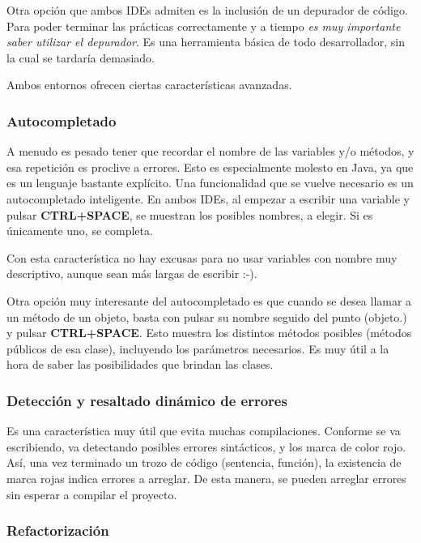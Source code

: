 \documentclass[11pt]{article}
\begin{document}
Otra opción que ambos IDEs admiten es la inclusión de un depurador de código. Para poder terminar las prácticas correctamente y a tiempo \emph{es muy importante saber utilizar el depurador}. Es una herramienta básica de todo desarrollador, sin la cual se tardaría demasiado.

Ambos entornos ofrecen ciertas características avanzadas.

\subsubsection{Autocompletado}
\label{sec-3-2-1}

A menudo es pesado tener que recordar el nombre de las variables y/o métodos, y esa repetición es proclive a errores.  Esto es especialmente molesto en Java, ya que es un lenguaje bastante explícito.  Una funcionalidad que se vuelve necesario es un autocompletado inteligente. En ambos IDEs, al empezar a escribir una variable y pulsar \textbf{CTRL+SPACE}, se muestran los posibles nombres, a elegir. Si es únicamente uno, se completa. 

Con esta característica no hay excusas para no usar variables con nombre muy descriptivo, aunque sean más largas de escribir :-). 

Otra opción muy interesante del autocompletado es que cuando se desea llamar a un método de un objeto, basta con pulsar su nombre seguido del punto (\textsf{objeto.}) y pulsar \textbf{CTRL+SPACE}. Esto muestra los distintos métodos posibles
(métodos públicos de esa clase), incluyendo los parámetros necesarios. Es muy útil a la hora de saber las posibilidades que brindan las clases.

\subsubsection{Detección y resaltado dinámico de errores}
\label{sec-3-2-2}


Es una característica muy útil que evita muchas compilaciones. Conforme se va escribiendo, va detectando
posibles errores sintácticos, y los marca de color rojo. Así, una vez terminado un trozo de código (sentencia, 
función), la existencia de marca rojas indica errores a arreglar. De esta manera, se pueden arreglar
errores sin esperar a compilar el proyecto.
\subsubsection{Refactorización}
\label{sec-3-2-3}
\end{document}

